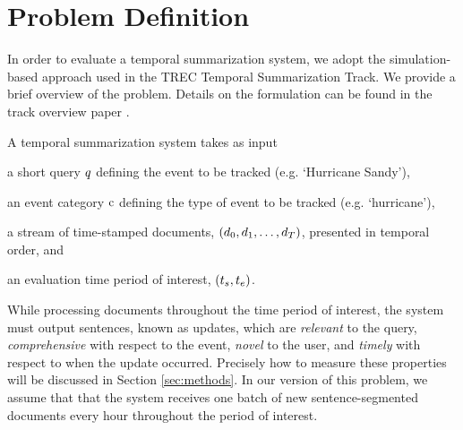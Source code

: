 \section{Problem Definition}
\label{sec:problemdefinition}
In order to evaluate a temporal summarization system, we adopt the simulation-based approach used in the TREC Temporal Summarization Track.  We provide a brief overview of the problem.  Details on the formulation can be found in the track overview paper \cite{aslam2013trec}.  

A temporal summarization system takes as input 
\begin{enumerate*}[label=\itshape\alph*\upshape)]
  \item a short query $q$ defining the event to be tracked (e.g. `Hurricane Sandy'), 
  \item an event category $\operatorname{c}$ defining the type of event to be tracked (e.g. `hurricane'), 
  \item a stream of time-stamped documents, $(\operatorname{\mathnormal{d}}_0, \operatorname{\mathnormal{d}}_1,\ldots,\operatorname{\mathnormal{d}}_T)$, presented in temporal order, and
	\item an evaluation time period of interest, $(t_s,t_e)$.  
\end{enumerate*}
While processing documents throughout the time period of interest, the system must output sentences, known as updates, which are \emph{relevant} to the query, \emph{comprehensive} with respect to the event, \emph{novel} to the user, and \emph{timely} with respect to when the update occurred.  Precisely how to measure these properties will be discussed in Section \ref{sec:methods}.  In our version of this problem, we assume that that the system receives one batch of new sentence-segmented documents every hour throughout the period of interest.  


